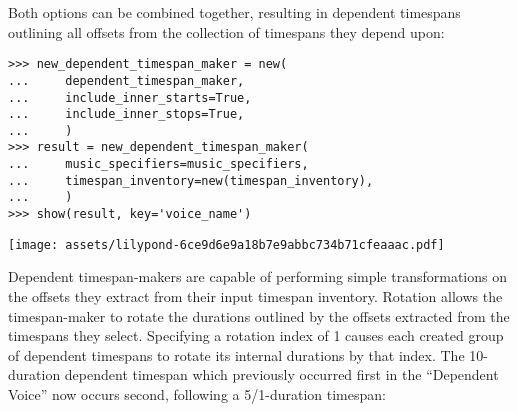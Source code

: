 \noindent Both options can be combined together, resulting in dependent
timespans outlining all offsets from the collection of timespans they depend
upon:

\begin{comment}
<abjad>
new_dependent_timespan_maker = new(
    dependent_timespan_maker,
    include_inner_starts=True,
    include_inner_stops=True,
    )
result = new_dependent_timespan_maker(
    music_specifiers=music_specifiers,
    timespan_inventory=new(timespan_inventory),
    )
show(result, key='voice_name')
</abjad>
\end{comment}

\begin{abjadbookoutput}
\begin{singlespacing}
\vspace{-0.5\baselineskip}
\begin{lstlisting}
>>> new_dependent_timespan_maker = new(
...     dependent_timespan_maker,
...     include_inner_starts=True,
...     include_inner_stops=True,
...     )
>>> result = new_dependent_timespan_maker(
...     music_specifiers=music_specifiers,
...     timespan_inventory=new(timespan_inventory),
...     )
>>> show(result, key='voice_name')
\end{lstlisting}
\noindent\texttt{[image: assets/lilypond-6ce9d6e9a18b7e9abbc734b71cfeaaac.pdf]}
\end{singlespacing}
\end{abjadbookoutput}

\noindent Dependent timespan-makers are capable of performing simple
transformations on the offsets they extract from their input timespan
inventory. Rotation allows the timespan-maker to rotate the durations outlined
by the offsets extracted from the timespans they select. Specifying a rotation
index of 1 causes each created group of dependent timespans to rotate its
internal durations by that index. The 10-duration dependent timespan which
previously occurred first in the \enquote{Dependent Voice} now occurs second,
following a 5/1-duration timespan:

\begin{comment}
<abjad>
rotated_dependent_timespan_maker = new(
    new_dependent_timespan_maker,
    rotation_indices=(1,),
    )
result = rotated_dependent_timespan_maker(
    music_specifiers=music_specifiers,
    timespan_inventory=new(timespan_inventory),
    )
show(result, key='voice_name', range_=(0, 75))
</abjad>
\end{comment}

